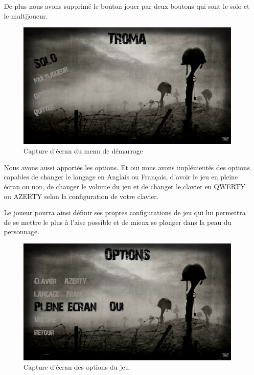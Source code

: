 \documentclass[11pt]{report}
\begin{document}
De plus nous avons supprimé le bouton jouer par deux boutons qui sont le solo et le multijoueur. 

\begin{figure}[htbp]
\centering
\includegraphics[scale=0.13]{menu-start.png}
\caption{Capture d'écran du menu de démarrage}
\end{figure}

Nous avons aussi apportés les options. Et oui nous avons implémentés des options capables de changer le langage en Anglais ou Français, d’avoir le jeu en pleine écran ou non, de changer le volume du jeu et de changer le clavier en QWERTY ou AZERTY selon la configuration de votre clavier.

Le joueur pourra ainsi définir ses propres configurations de jeu qui lui permettra de se mettre le plus à l’aise possible et de mieux se plonger dans la peau du personnage.

\begin{figure}[htbp]
\centering
\includegraphics[scale=0.13]{menu-option.png}
\caption{Capture d'écran des options du jeu}
\end{figure}
\end{document}
